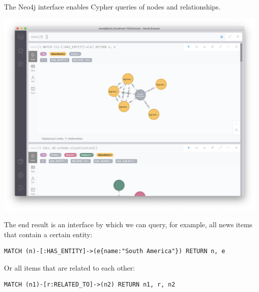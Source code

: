 \documentclass[11pt]{article}   	%
\begin{document}
The Neo4j interface enables Cypher queries of nodes and relationships.

\includegraphics[scale=0.3]{neo4j-cypher-interface}

The end result is an interface by which we can query, for example, all news items that contain a certain entity:

\begin{verbatim}
MATCH (n)-[:HAS_ENTITY]->(e{name:"South America"}) RETURN n, e
\end{verbatim}

Or all items that are related to each other:

\begin{verbatim}
MATCH (n1)-[r:RELATED_TO]->(n2) RETURN n1, r, n2
\end{verbatim}
\end{document}
